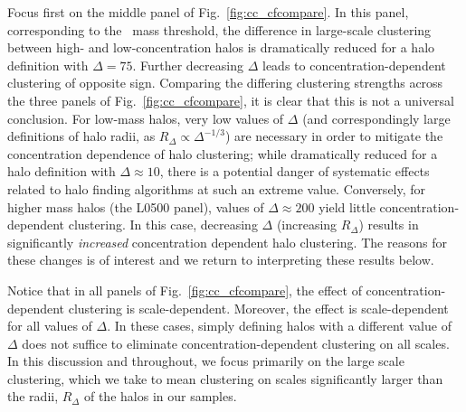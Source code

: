 \documentclass[usenatbib,usegraphicx,letterpaper]{mn2e}
\begin{document}
Focus first on the middle panel of Fig.~\ref{fig:cc_cfcompare}. In this panel, corresponding to the 
\simB~mass threshold, the difference in large-scale clustering between high- and low-concentration halos 
is dramatically reduced for a halo definition with $\Delta=75$. Further decreasing $\Delta$ leads to
concentration-dependent clustering of opposite sign. Comparing the differing clustering 
strengths across the three panels of Fig.~\ref{fig:cc_cfcompare}, it is clear that this is not a universal
conclusion. For low-mass halos, very low values of $\Delta$ (and correspondingly large definitions of halo radii,
as $R_{\Delta} \propto \Delta^{-1/3}$) are necessary in order to mitigate the concentration dependence of halo
clustering; while dramatically reduced for a halo definition with $\Delta \approx 10$, there is a potential
danger of systematic effects related to halo finding algorithms at such an extreme value. Conversely, for higher
mass halos (the L0500 panel), values of $\Delta \approx 200$ yield little concentration-dependent clustering. In
this case, decreasing $\Delta$ (increasing $R_{\Delta}$) results in significantly {\em increased} concentration
dependent halo clustering. The reasons for these changes is of interest and we return to interpreting these
results below.

Notice that in all panels of Fig.~\ref{fig:cc_cfcompare}, the effect of concentration-dependent clustering is
scale-dependent. Moreover, the effect is scale-dependent for all values of $\Delta$. In these cases, simply
defining halos with a different value of $\Delta$ does not suffice to eliminate concentration-dependent
clustering on all scales. In this discussion and throughout, we focus primarily on the large scale clustering,
which we take to mean clustering on scales significantly larger than the radii, $R_{\Delta}$ of the halos in our
samples.

\end{document}

